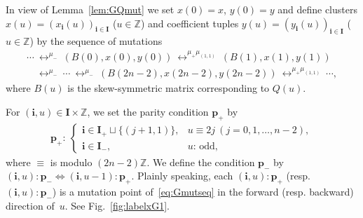 In view of Lemma~\ref{lem:GQmut}
we set $x(0)=x$, $y(0)=y$ and def\/ine
clusters $x(u)=(x_{\mathbf{i}}(u))_{\mathbf{i}\in \mathbf{I}}$
 ($u\in \mathbb{Z}$)
 and coef\/f\/icient tuples $y(u)=(y_\mathbf{i}(u))_{\mathbf{i}\in \mathbf{I}}$
 ($u\in \mathbb{Z}$)
by the sequence of mutations
\begin{gather}
\cdots
\ \mathop{\longleftrightarrow}^{\mu_-}\
(B(0),x(0),y(0))
\ \mathop{\longleftrightarrow}^{\mu_+
\mu_{(1,1)}}\
(B(1),x(1),y(1))\nonumber\\
\phantom{\cdots}{} \ \mathop{\longleftrightarrow}^{\mu_-}\
\cdots
\ \mathop{\longleftrightarrow}^{\mu_-}\
(B(2n-2),x(2n-2),y(2n-2))
\ \mathop{\longleftrightarrow}^{\mu_+
\mu_{(1,1)}}\
\cdots,\label{eq:Gmutseq}
\end{gather}
where $B(u)$ is the skew-symmetric matrix corresponding to
$Q(u)$.

For  $(\mathbf{i},u)\in
 \mathbf{I}\times \mathbb{Z}$,
we set the parity condition $\mathbf{p}_+$ by
\begin{gather}
\label{eq:GQparity}
\mathbf{p}_+: \
\begin{cases}
 \mathbf{i}\in
\mathbf{I}_+ \sqcup
\{(j+1,1)\},
& u\equiv 2j
\ (j=0,1,\dots,n-2),\\
 \mathbf{i}\in
\mathbf{I}_-,
& \mbox{$u$: odd},
\end{cases}
\end{gather}
where $\equiv$ is modulo $(2n-2)\mathbb{Z}$.
We def\/ine the condition $\mathbf{p}_-$
by $(\mathbf{i},u):\mathbf{p}_- \Longleftrightarrow
(\mathbf{i},u-1):\mathbf{p}_+$.
Plainly speaking,
each $(\mathbf{i},u):\mathbf{p}_+$
(resp.\ $(\mathbf{i},u):\mathbf{p}_-$)
is a mutation point of~\eqref{eq:Gmutseq} in the forward
(resp. backward) direction of~$u$.
See Fig.~\ref{fig:labelxG1}.

